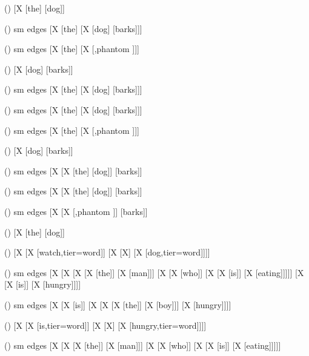 \begin {forest}()
 [X [the] [dog]] \end {forest}
\begin {forest}()
 sm edges [X [the] [X [dog] [barks]]] \end {forest}
\begin {forest}()
 sm edges [X [the] [X [,phantom ]]] \end {forest}
\begin {forest}()
 [X [dog] [barks]] \end {forest}
\begin {forest}()
 sm edges [X [the] [X [dog] [barks]]] \end {forest}
\begin {forest}()
 sm edges [X [the] [X [dog] [barks]]] \end {forest}
\begin {forest}()
 sm edges [X [the] [X [,phantom ]]] \end {forest}
\begin {forest}()
 [X [dog] [barks]] \end {forest}
\begin {forest}()
 sm edges [X [X [the] [dog]] [barks]] \end {forest}
\begin {forest}()
 sm edges [X [X [the] [dog]] [barks]] \end {forest}
\begin {forest}()
 sm edges [X [X [,phantom ]] [barks]] \end {forest}
\begin {forest}()
 [X [the] [dog]] \end {forest}
\begin {forest}()
 [X [X [watch,tier=word]] [X [X] [X [dog,tier=word]]]] \end {forest}
\begin {forest}()
 sm edges [X [X [X [X [the]] [X [man]]] [X [X [who]] [X [X [is]] [X [eating]]]]] [X [X [is]] [X [hungry]]]] \end {forest}
\begin {forest}()
 sm edges [X [X [is]] [X [X [X [the]] [X [boy]]] [X [hungry]]]] \end {forest}
\begin {forest}()
 [X [X [is,tier=word]] [X [X] [X [hungry,tier=word]]]] \end {forest}
\begin {forest}()
 sm edges [X [X [X [the]] [X [man]]] [X [X [who]] [X [X [is]] [X [eating]]]]] \end {forest}
